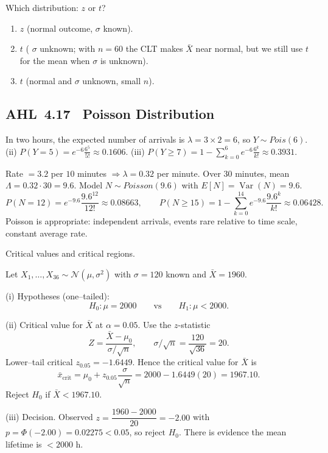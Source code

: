 \documentclass[11pt]{article}
\def\textbf#1{#1}%
\def\mathrm#1{#1}%
\newcommand{\tocsubsection}[1]{\subsection{#1}}
\begin{document}
\begin{solution}
\textbf{Which distribution: $z$ or $t$?}

\begin{enumerate}
  \item $z$ (normal outcome, $\sigma$ known).
  \item $t$ ( $\sigma$ unknown; with $n=60$ the CLT makes $\bar X$ near normal, but we still use $t$ for the mean when $\sigma$ is unknown).
  \item $t$ (normal and $\sigma$ unknown, small $n$).
\end{enumerate}
\end{solution}



\tocsubsection{AHL 4.17 \; Poisson Distribution}

\begin{solution}
In two hours, the expected number of arrivals is $\lambda=3\times2=6$, so
$Y\sim\mathrm{Pois}(6)$.  (ii) $P(Y=5)=e^{-6}\tfrac{6^5}{5!}\approx0.1606$.
(iii) $P(Y\ge7)=1-\sum_{k=0}^6 e^{-6}\tfrac{6^k}{k!}\approx0.3931$.
\end{solution}

\begin{solution}
Rate $=3.2$ per $10$ minutes $\Rightarrow \lambda=0.32$ per minute. Over $30$ minutes, mean $\Lambda=0.32\cdot 30=9.6$. Model $N\sim\mathrm{Poisson}(9.6)$ with $E[N]=\operatorname{Var}(N)=9.6$.
\[
P(N=12)=e^{-9.6}\frac{9.6^{12}}{12!}\approx 0.08663,\qquad
P(N\ge 15)=1-\sum_{k=0}^{14}e^{-9.6}\frac{9.6^k}{k!}\approx 0.06428.
\]
Poisson is appropriate: independent arrivals, events rare relative to time scale, constant average rate.
\end{solution}





\begin{solution}
\textbf{Critical values and critical regions.}

Let $X_1,\dots,X_{36}\sim\mathcal N(\mu,\sigma^2)$ with $\sigma=120$ known and $\bar X=1960$.

\textbf{(i) Hypotheses (one–tailed):}
\[
H_0:\mu=2000 \qquad\text{vs}\qquad H_1:\mu<2000.
\]

\textbf{(ii) Critical value for $\bar X$ at $\alpha=0.05$.}
Use the $z$-statistic
\[
Z=\frac{\bar X-\mu_0}{\sigma/\sqrt{n}},\qquad \sigma/\sqrt{n}=\frac{120}{\sqrt{36}}=20.
\]
Lower–tail critical $z_{0.05}=-1.6449$. Hence the critical value for $\bar X$ is
\[
\bar x_{\text{crit}}=\mu_0+z_{0.05}\frac{\sigma}{\sqrt n}
=2000-1.6449(20)=\boxed{1967.10}.
\]
Reject $H_0$ if $\bar X<1967.10$.

\textbf{(iii) Decision.}
Observed $z=\dfrac{1960-2000}{20}=-2.00$ with $p=\Phi(-2.00)=0.02275<0.05$,
so $\boxed{\text{reject }H_0}$. There is evidence the mean lifetime is $<2000$ h.
\end{solution}
\end{document}
